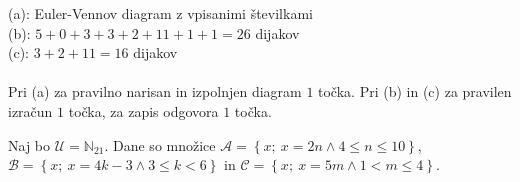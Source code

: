 \documentclass[addpoints]{exam}
\begin{document}
\begin{questions}

    \begin{solution}[8cm]
        (a): Euler-Vennov diagram z vpisanimi številkami \\
        (b): $5+0+3+3+2+11+1+1=26$ dijakov \\
        (c): $3+2+11=16$ dijakov \\ \\
        Pri (a) za pravilno narisan in izpolnjen diagram $1$ točka. Pri (b) in (c) za pravilen izračun $1$ točka, za zapis odgovora $1$ točka.
    \end{solution}




    \newpage

    \question
    Naj bo $\mathcal{U}=\mathbb{N}_{21}$. Dane so množice $\mathcal{A}=\left\{x;\ x=2n \land 4\leq n \leq10\right\}$, $\mathcal{B}=\left\{x;\ x=4k-3 \land 3\leq k< 6\right\}$ in $\mathcal{C}=\left\{x;\ x=5m \land 1<m\leq 4\right\}$. 


\end{questions}
\end{document}
